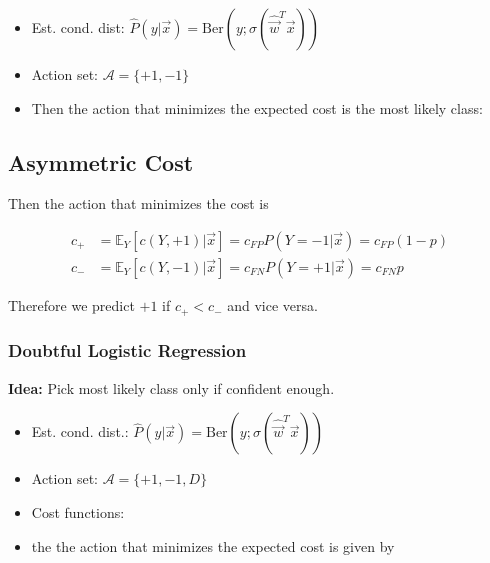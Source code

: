 \documentclass[10pt,a4paper]{scrartcl}
\newcommand{\Argmax}[2]{\text{arg}\underset{#1}{\max}\left(#2\right)}
\begin{document}
\begin{multicols*}{2}
\begin{itemize}
\item Est. cond. dist: $\hat{P}(y|\vec{x})=\text{Ber}(y;\sigma(\hat{\vec{w}}^T\vec{x}))$
\item Action set: $\mathcal{A}=\{+1,-1\}$
\item Then the action that minimizes the expected cost is the most likely class:

\mportant{$a^\ast=\Argmax{y}{\hat{P}(y|\vec{x})=\text{sign}(\vec{w}^T\vec{x})}$}
\end{itemize}

\subsection{Asymmetric Cost}


Then the action that minimizes the cost is

\begin{align*}
c_+&=\mathbb{E}_Y\left[c(Y,+1)|\vec{x}\right]=c_{FP}P(Y=-1|\vec{x})=c_{FP}(1-p)\\
c_-&=\mathbb{E}_Y\left[c(Y,-1)|\vec{x}\right]=c_{FN}P(Y=+1|\vec{x})=c_{FN} p
\end{align*}

Therefore we predict $+1$ if $c_+<c_-$ and vice versa.

\subsubsection{Doubtful Logistic Regression}

\textbf{Idea:} Pick most likely class only if confident enough.

\begin{itemize}
\item Est. cond. dist.: $\hat{P}(y|\vec{x})=\text{Ber}(y;\sigma(\hat{\vec{w}}^T\vec{x}))$
\item Action set: $\mathcal{A}=\{+1,-1,D\}$
\item Cost functions:

\item the the action that minimizes the expected cost is given by


\end{itemize}
\end{multicols*}
\end{document}
